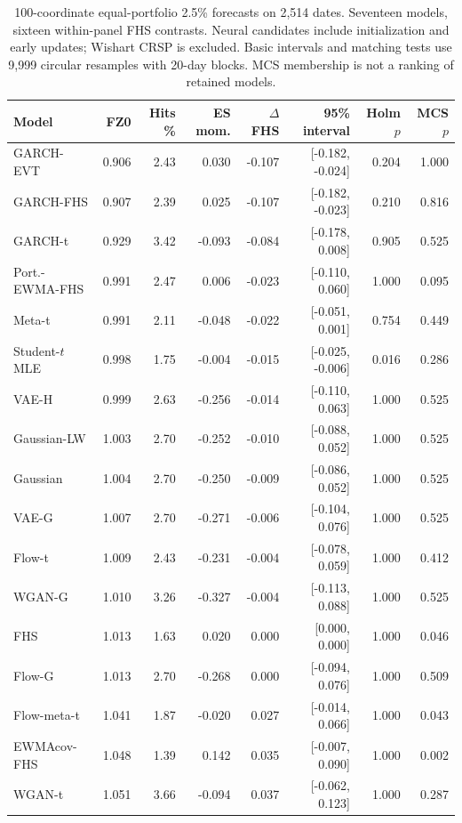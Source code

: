 \documentclass[11pt]{article}
\theoremstyle{definition}\newtheorem{definition}[theorem]{Definition}
\theoremstyle{remark}\newtheorem{remark}[theorem]{Remark}
\begin{document}
\begin{table}[htbp]
\centering\footnotesize
\setlength{\tabcolsep}{4pt}
\begin{tabular}{lrrrrrrr}
\toprule
Model & FZ0 & Hits \% & ES mom. & $\Delta$ FHS & 95\% interval & Holm $p$ & MCS $p$ \\
\midrule
GARCH-EVT & 0.906 & 2.43 & 0.030 & -0.107 & [-0.182, -0.024] & 0.204 & 1.000 \\
GARCH-FHS & 0.907 & 2.39 & 0.025 & -0.107 & [-0.182, -0.023] & 0.210 & 0.816 \\
GARCH-t & 0.929 & 3.42 & -0.093 & -0.084 & [-0.178, 0.008] & 0.905 & 0.525 \\
Port.-EWMA-FHS & 0.991 & 2.47 & 0.006 & -0.023 & [-0.110, 0.060] & 1.000 & 0.095 \\
Meta-t & 0.991 & 2.11 & -0.048 & -0.022 & [-0.051, 0.001] & 0.754 & 0.449 \\
Student-$t$ MLE & 0.998 & 1.75 & -0.004 & -0.015 & [-0.025, -0.006] & 0.016 & 0.286 \\
VAE-H & 0.999 & 2.63 & -0.256 & -0.014 & [-0.110, 0.063] & 1.000 & 0.525 \\
Gaussian-LW & 1.003 & 2.70 & -0.252 & -0.010 & [-0.088, 0.052] & 1.000 & 0.525 \\
Gaussian & 1.004 & 2.70 & -0.250 & -0.009 & [-0.086, 0.052] & 1.000 & 0.525 \\
VAE-G & 1.007 & 2.70 & -0.271 & -0.006 & [-0.104, 0.076] & 1.000 & 0.525 \\
Flow-t & 1.009 & 2.43 & -0.231 & -0.004 & [-0.078, 0.059] & 1.000 & 0.412 \\
WGAN-G & 1.010 & 3.26 & -0.327 & -0.004 & [-0.113, 0.088] & 1.000 & 0.525 \\
FHS & 1.013 & 1.63 & 0.020 & 0.000 & [0.000, 0.000] & 1.000 & 0.046 \\
Flow-G & 1.013 & 2.70 & -0.268 & 0.000 & [-0.094, 0.076] & 1.000 & 0.509 \\
Flow-meta-t & 1.041 & 1.87 & -0.020 & 0.027 & [-0.014, 0.066] & 1.000 & 0.043 \\
EWMAcov-FHS & 1.048 & 1.39 & 0.142 & 0.035 & [-0.007, 0.090] & 1.000 & 0.002 \\
WGAN-t & 1.051 & 3.66 & -0.094 & 0.037 & [-0.062, 0.123] & 1.000 & 0.287 \\
\bottomrule
\end{tabular}
\caption{100-coordinate equal-portfolio 2.5\% forecasts on 2,514 dates. Seventeen models, sixteen within-panel FHS contrasts. Neural candidates include initialization and early updates; Wishart CRSP is excluded. Basic intervals and matching tests use 9,999 circular resamples with 20-day blocks. MCS membership is not a ranking of retained models.}\label{tab:r4-crsp100-secondary}
\end{table}
\end{document}

